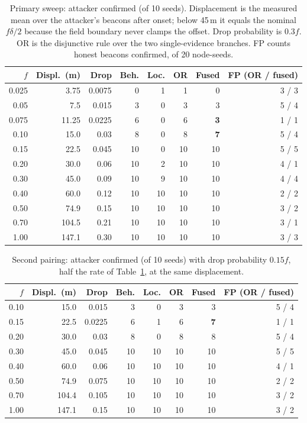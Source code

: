 \documentclass[pdflatex,sn-mathphys-num]{sn-jnl}
\begin{document}
\begin{table}[!t]
\caption{Primary sweep: attacker confirmed (of 10 seeds). Displacement is the
measured mean over the attacker's beacons after onset; below 45\,m it equals
the nominal $f\delta/2$ because the field boundary never clamps the offset.
Drop probability is $0.3f$. OR is the disjunctive rule over the
two single-evidence branches. FP counts honest beacons confirmed, of 20
node-seeds.}
\label{tab:sweep}
\centering
\small
\setlength{\tabcolsep}{4pt}
\begin{tabular}{@{}rrrrrrrr@{}}
\toprule
$f$ & Displ.\ (m) & Drop & Beh. & Loc. & OR & Fused & FP (OR / fused) \\
\midrule
0.025 & 3.75 & 0.0075 & 0 & 1 & 1 & 0 & 3 / 3 \\
0.05 & 7.5 & 0.015 & 3 & 0 & 3 & 3 & 5 / 4 \\
0.075 & 11.25 & 0.0225 & 6 & 0 & 6 & \textbf{3} & 1 / 1 \\
0.10 & 15.0 & 0.03 & 8 & 0 & 8 & \textbf{7} & 5 / 4 \\
0.15 & 22.5 & 0.045 & 10 & 0 & 10 & 10 & 5 / 5 \\
0.20 & 30.0 & 0.06 & 10 & 2 & 10 & 10 & 4 / 1 \\
0.30 & 45.0 & 0.09 & 10 & 9 & 10 & 10 & 4 / 4 \\
0.40 & 60.0 & 0.12 & 10 & 10 & 10 & 10 & 2 / 2 \\
0.50 & 74.9 & 0.15 & 10 & 10 & 10 & 10 & 3 / 2 \\
0.70 & 104.5 & 0.21 & 10 & 10 & 10 & 10 & 3 / 1 \\
1.00 & 147.1 & 0.30 & 10 & 10 & 10 & 10 & 3 / 3 \\
\bottomrule
\end{tabular}
\end{table}

\begin{table}[!t]
\caption{Second pairing: attacker confirmed (of 10 seeds) with drop probability
$0.15f$, half the rate of Table~\ref{tab:sweep}, at the same displacement.}
\label{tab:sweep2}
\centering
\small
\setlength{\tabcolsep}{4pt}
\begin{tabular}{@{}rrrrrrrr@{}}
\toprule
$f$ & Displ.\ (m) & Drop & Beh. & Loc. & OR & Fused & FP (OR / fused) \\
\midrule
0.10 & 15.0 & 0.015 & 3 & 0 & 3 & 3 & 5 / 4 \\
0.15 & 22.5 & 0.0225 & 6 & 1 & 6 & \textbf{7} & 1 / 1 \\
0.20 & 30.0 & 0.03 & 8 & 0 & 8 & 8 & 5 / 4 \\
0.30 & 45.0 & 0.045 & 10 & 10 & 10 & 10 & 5 / 5 \\
0.40 & 60.0 & 0.06 & 10 & 10 & 10 & 10 & 4 / 1 \\
0.50 & 74.9 & 0.075 & 10 & 10 & 10 & 10 & 2 / 2 \\
0.70 & 104.4 & 0.105 & 10 & 10 & 10 & 10 & 3 / 2 \\
1.00 & 147.1 & 0.15 & 10 & 10 & 10 & 10 & 3 / 2 \\
\bottomrule
\end{tabular}
\end{table}
\end{document}
